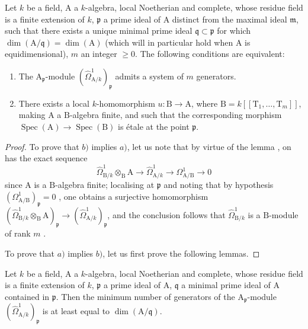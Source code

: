\begin{proposition}[18.11.5]
\label{IV.18.11.5}
Let $k$ be a field, $\mathrm{A}$ a $k$-algebra, local Noetherian and complete, whose residue field is a finite extension of $k$, $\mathfrak{p}$ a prime ideal of $\mathrm{A}$ distinct from the maximal ideal $\mathfrak{m}$, such that there exists a unique minimal prime ideal $\mathfrak{q}\subset\mathfrak{p}$ for which $\dim(\mathrm{A}/\mathfrak{q})=\dim(\mathrm{A})$ (which will in particular hold when $\mathrm{A}$ is equidimensional), $m$ an integer $\geq 0$.
The following conditions are equivalent:
\begin{enumerate}[label=\alph*)]
  \item The $\mathrm{A}_\mathfrak{p}$-module $(\hat{\Omega}^1_{\mathrm{A}/k})_\mathfrak{p}$ admits a system of $m$ generators.
  \item There exists a local $k$-homomorphism $u:\mathrm{B}\to\mathrm{A}$, where $\mathrm{B}=k[[\mathrm{T}_1,\ldots,\mathrm{T}_m]]$, making $\mathrm{A}$ a $\mathrm{B}$-algebra finite, and such that the corresponding morphism $\operatorname{Spec}(\mathrm{A})\to\operatorname{Spec}(\mathrm{B})$ is \'etale at the point $\mathfrak{p}$.
\end{enumerate}
\end{proposition}

\begin{proof}
To prove that $b)$ implies $a)$, let us note that by virtue of the lemma , on has the exact sequence
\[
  \hat{\Omega}^1_{\mathrm{B}/k}\otimes_\mathrm{B}\mathrm{A}\to\hat{\Omega}^1_{\mathrm{A}/k}\to\Omega^1_{\mathrm{A}/\mathrm{B}}\to 0
\]
since $\mathrm{A}$ is a $\mathrm{B}$-algebra finite; localising at $\mathfrak{p}$ and noting that by hypothesis $(\Omega^1_{\mathrm{A}/\mathrm{B}})_\mathfrak{p}=0$ , one obtains a surjective homomorphism $(\hat{\Omega}^1_{\mathrm{B}/k}\otimes_\mathrm{B}\mathrm{A})_\mathfrak{p}\to(\hat{\Omega}^1_{\mathrm{A}/k})_\mathfrak{p}$, and
the conclusion follows that $\hat{\Omega}^1_{\mathrm{B}/k}$ is a $\mathrm{B}$-module of rank $m$ .

To prove that $a)$ implies $b)$, let us first prove the following lemmas.
\end{proof}

\begin{lemma}[18.11.5.1]
\label{IV.18.11.5.1}
Let $k$ be a field, $\mathrm{A}$ a $k$-algebra, local Noetherian and complete, whose residue field is a finite extension of $k$, $\mathfrak{p}$ a prime ideal of $\mathrm{A}$, $\mathfrak{q}$ a minimal prime ideal of $\mathrm{A}$ contained in $\mathfrak{p}$.
Then the minimum number of generators of the $\mathrm{A}_\mathfrak{p}$-module $(\hat{\Omega}^1_{\mathrm{A}/k})_\mathfrak{p}$ is at least equal to $\dim(\mathrm{A}/\mathfrak{q})$.
\end{lemma}


